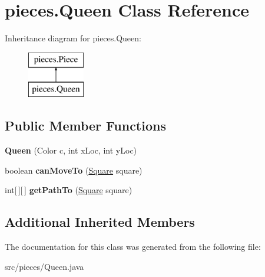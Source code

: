 \hypertarget{classpieces_1_1_queen}{\section{pieces.\-Queen Class Reference}
\label{classpieces_1_1_queen}
}
Inheritance diagram for pieces.\-Queen\-:\begin{figure}[H]
\begin{center}
\leavevmode
\includegraphics[height=2.000000cm]{classpieces_1_1_queen}
\end{center}
\end{figure}
\subsection*{Public Member Functions}
\begin{DoxyCompactItemize}
\item 
\hypertarget{classpieces_1_1_queen_aa5762e91511816d25d350436976ba7c7}{{\bfseries Queen} (Color c, int x\-Loc, int y\-Loc)}\label{classpieces_1_1_queen_aa5762e91511816d25d350436976ba7c7}

\item 
\hypertarget{classpieces_1_1_queen_a8dc3ad565ab37e8c006906a90024061f}{boolean {\bfseries can\-Move\-To} (\hyperlink{classboard_1_1_square}{Square} square)}\label{classpieces_1_1_queen_a8dc3ad565ab37e8c006906a90024061f}

\item 
\hypertarget{classpieces_1_1_queen_af73e59003745d9ee4055de6925cdc241}{int\mbox{[}$\,$\mbox{]}\mbox{[}$\,$\mbox{]} {\bfseries get\-Path\-To} (\hyperlink{classboard_1_1_square}{Square} square)}\label{classpieces_1_1_queen_af73e59003745d9ee4055de6925cdc241}

\end{DoxyCompactItemize}
\subsection*{Additional Inherited Members}


The documentation for this class was generated from the following file\-:\begin{DoxyCompactItemize}
\item 
src/pieces/Queen.\-java\end{DoxyCompactItemize}
